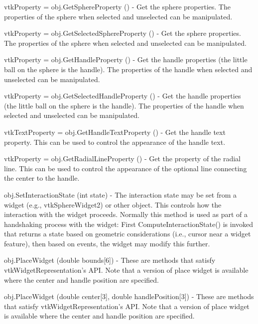 \begin{DoxyItemize}
\item {\ttfamily vtk\-Property = obj.\-Get\-Sphere\-Property ()} -\/ Get the sphere properties. The properties of the sphere when selected and unselected can be manipulated.  
\item {\ttfamily vtk\-Property = obj.\-Get\-Selected\-Sphere\-Property ()} -\/ Get the sphere properties. The properties of the sphere when selected and unselected can be manipulated.  
\item {\ttfamily vtk\-Property = obj.\-Get\-Handle\-Property ()} -\/ Get the handle properties (the little ball on the sphere is the handle). The properties of the handle when selected and unselected can be manipulated.  
\item {\ttfamily vtk\-Property = obj.\-Get\-Selected\-Handle\-Property ()} -\/ Get the handle properties (the little ball on the sphere is the handle). The properties of the handle when selected and unselected can be manipulated.  
\item {\ttfamily vtk\-Text\-Property = obj.\-Get\-Handle\-Text\-Property ()} -\/ Get the handle text property. This can be used to control the appearance of the handle text.  
\item {\ttfamily vtk\-Property = obj.\-Get\-Radial\-Line\-Property ()} -\/ Get the property of the radial line. This can be used to control the appearance of the optional line connecting the center to the handle.  
\item {\ttfamily obj.\-Set\-Interaction\-State (int state)} -\/ The interaction state may be set from a widget (e.\-g., vtk\-Sphere\-Widget2) or other object. This controls how the interaction with the widget proceeds. Normally this method is used as part of a handshaking process with the widget\-: First Compute\-Interaction\-State() is invoked that returns a state based on geometric considerations (i.\-e., cursor near a widget feature), then based on events, the widget may modify this further.  
\item {\ttfamily obj.\-Place\-Widget (double bounds\mbox{[}6\mbox{]})} -\/ These are methods that satisfy vtk\-Widget\-Representation's A\-P\-I. Note that a version of place widget is available where the center and handle position are specified.  
\item {\ttfamily obj.\-Place\-Widget (double center\mbox{[}3\mbox{]}, double handle\-Position\mbox{[}3\mbox{]})} -\/ These are methods that satisfy vtk\-Widget\-Representation's A\-P\-I. Note that a version of place widget is available where the center and handle position are specified.  

\end{DoxyItemize}
